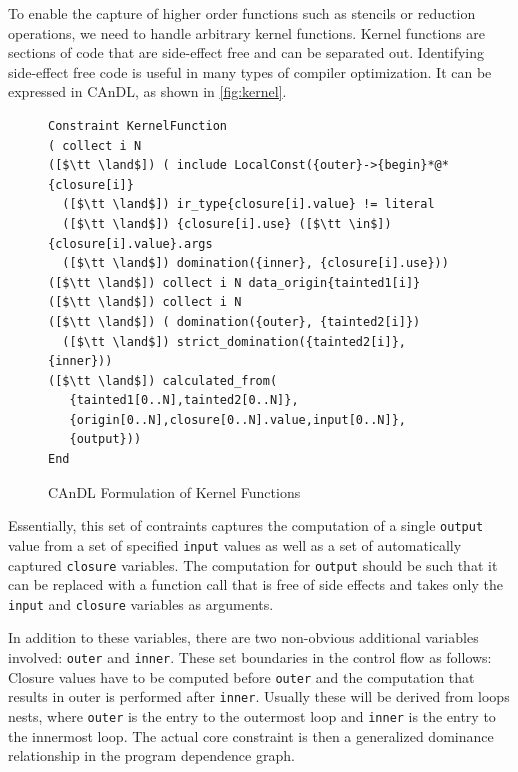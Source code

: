 

\newpage

    To enable the capture of higher order functions such as stencils or
    reduction operations, we need to handle arbitrary kernel functions.
    Kernel functions are sections of code that are side-effect free and
    can be separated out. Identifying side-effect free code is useful in
    many types of compiler optimization.  It can be expressed in CAnDL, as
    shown in \autoref{fig:kernel}.

\begin{figure}[ht]
\begin{lstlisting}[language=CAnDL]
Constraint KernelFunction
( collect i N
([$\tt \land$]) ( include LocalConst({outer}->{begin}*@*{closure[i]}
  ([$\tt \land$]) ir_type{closure[i].value} != literal
  ([$\tt \land$]) {closure[i].use} ([$\tt \in$]) {closure[i].value}.args
  ([$\tt \land$]) domination({inner}, {closure[i].use}))
([$\tt \land$]) collect i N data_origin{tainted1[i]}
([$\tt \land$]) collect i N
([$\tt \land$]) ( domination({outer}, {tainted2[i]})
  ([$\tt \land$]) strict_domination({tainted2[i]}, {inner}))
([$\tt \land$]) calculated_from(
   {tainted1[0..N],tainted2[0..N]},
   {origin[0..N],closure[0..N].value,input[0..N]},
   {output}))
End
\end{lstlisting}
\vspace{-0.3cm}
\caption{CAnDL Formulation of Kernel Functions}
\label{fig:kernel}
\end{figure}

    Essentially, this set of contraints captures the computation of a
    single \texttt{output} value from a set of specified \texttt{input}
    values as well as a set of automatically captured \texttt{closure}
    variables.  The computation for \texttt{output} should be such that it
    can be replaced with a function call that is free of side effects and
    takes only the \texttt{input} and \texttt{closure} variables as
    arguments.

    In addition to these variables, there are two non-obvious additional
    variables involved: \texttt{outer} and \texttt{inner}.
    These set boundaries in the control flow as follows: Closure values have to
    be computed before \texttt{outer} and the computation that results in outer
    is performed after \texttt{inner}.
    Usually these will be derived from loops nests, where \texttt{outer} is the
    entry to the outermost loop and \texttt{inner} is the entry to the innermost
    loop.
    The actual core constraint is then a generalized dominance relationship in
    the program dependence graph.

